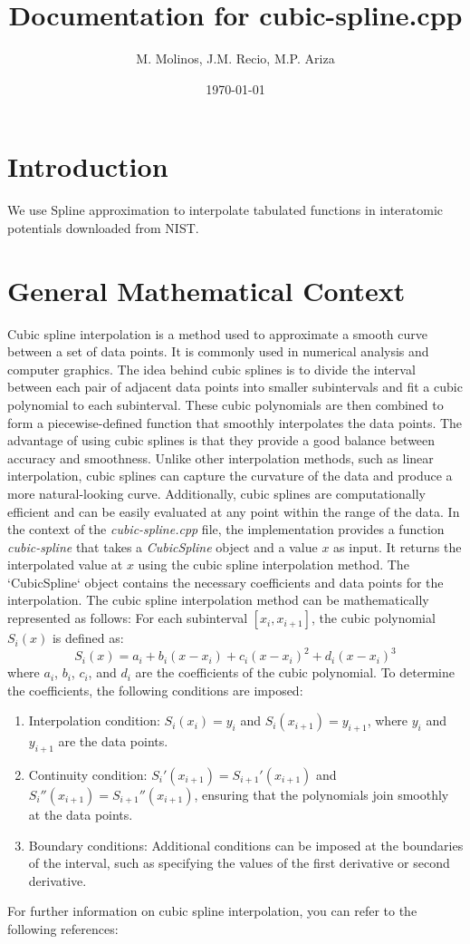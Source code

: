 \documentclass{article}
\title{Documentation for cubic-spline.cpp}
\author{M. Molinos, J.M. Recio, M.P. Ariza}
\date{\today}
\begin{document}
\maketitle

\section{Introduction}
We use Spline approximation to interpolate tabulated functions in interatomic potentials downloaded from NIST.

\section{General Mathematical Context}
Cubic spline interpolation is a method used to approximate a smooth curve between a set of data points. It is commonly used in numerical analysis and computer graphics. The idea behind cubic splines is to divide the interval between each pair of adjacent data points into smaller subintervals and fit a cubic polynomial to each subinterval. 
These cubic polynomials are then combined to form a piecewise-defined function that smoothly interpolates the data points.
The advantage of using cubic splines is that they provide a good balance between accuracy and smoothness. Unlike other interpolation methods, such as linear interpolation, cubic splines can capture the curvature of the data and produce a more natural-looking curve. 
Additionally, cubic splines are computationally efficient and can be easily evaluated at any point within the range of the data. In the context of the \textit{cubic-spline.cpp} file, the implementation provides a function \textit{cubic-spline} that takes a \textit{CubicSpline} object and a value $x$ as input. 
It returns the interpolated value at $x$ using the cubic spline interpolation method. The `CubicSpline` object contains the necessary coefficients and data points for the interpolation. The cubic spline interpolation method can be mathematically represented as follows: 
For each subinterval $[x_i, x_{i+1}]$, the cubic polynomial $S_i(x)$ is defined as:
\[
S_i(x) = a_i + b_i(x - x_i) + c_i(x - x_i)^2 + d_i(x - x_i)^3
\]
where $a_i$, $b_i$, $c_i$, and $d_i$ are the coefficients of the cubic polynomial. To determine the coefficients, the following conditions are imposed:
\begin{enumerate}
    \item Interpolation condition: $S_i(x_i) = y_i$ and $S_i(x_{i+1}) = y_{i+1}$, where $y_i$ and $y_{i+1}$ are the data points.
    \item Continuity condition: $S_i'(x_{i+1}) = S_{i+1}'(x_{i+1})$ and $S_i''(x_{i+1}) = S_{i+1}''(x_{i+1})$, ensuring that the polynomials join smoothly at the data points.
    \item Boundary conditions: Additional conditions can be imposed at the boundaries of the interval, such as specifying the values of the first derivative or second derivative.
\end{enumerate}
For further information on cubic spline interpolation, you can refer to the following references:
\end{document}
